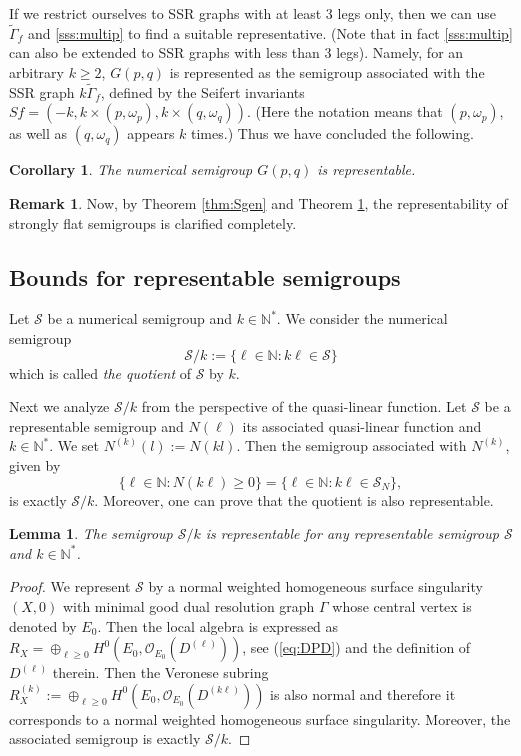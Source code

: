 \documentclass[oneside]{amsart}
\numberwithin{equation}{section}
\numberwithin{equation}{subsection}
\theoremstyle{plain}
\newtheorem{lemma}[equation]{Lemma}
\newtheorem{cor}[equation]{Corollary}
\theoremstyle{definition}
\newtheorem{remark}[equation]{Remark}
\newcommand{\calO}{{\mathcal O}}\newcommand{\calU}{{\mathcal U}}
\newcommand{\calS}{{\mathcal S}}\newcommand{\cals}{{\bf s}}\newcommand{\calst}{{\bf st}}\newcommand{\cS}{{\mathcal S}}
\newcommand{\w}{\omega}
\newcommand{\Se}{\mathcal{S}}
\begin{document}
If we restrict ourselves to SSR graphs with at least 3 legs only, then we can use $\widetilde{\Gamma}_f$ and \ref{sss:multip} to find a suitable representative. (Note that in fact \ref{sss:multip} can also be extended to SSR graphs with less than $3$ legs). Namely, for an arbitrary $k\geq 2$, $G(p,q)$ is represented as the semigroup associated with the SSR graph $k\widetilde{\Gamma}_f$, defined by the Seifert invariants $Sf=(-k,k\times (p,\w_p), k\times (q,\w_q))$. (Here the notation means that $(p,\w_p)$, as well as $(q,\w_q)$ appears $k$ times.) Thus we have concluded the following.

\begin{cor}\label{thm:twogen}
    The numerical semigroup $G(p,q)$ is representable.     
\end{cor}

\begin{remark}
Now, by Theorem \ref{thm:Sgen} and Theorem \ref{thm:twogen}, the representability of strongly flat semigroups is clarified completely. 
\end{remark}


\subsection{Bounds for representable semigroups}\label{sec:bounds}

    Let $\Se$ be a numerical semigroup and $k\in\mathbb{N}^*$. We consider the numerical semigroup 
    $$\Se/k:=\{\ell\in\mathbb{N}:k\ell\in\Se\}$$
      which is called {\it the quotient} of 
    $\Se$ by  $k$.

Next we analyze $\Se/k$  from the perspective of the quasi-linear function. Let $\calS$ be a representable semigroup  and $N(\ell)$ its associated quasi-linear function and $k\in \mathbb{N}^*$. We set $N^{(k)}(l):=N(k l)$.
Then the semigroup associated with $N^{(k)}$, given by 
\[
\{\ell\in\mathbb{N}:N(k \ell)\ge 0\}=
\{\ell\in\mathbb{N}:k \ell \in \Se_N\},
\]
 is exactly $\Se/k$. Moreover, one can prove that the quotient is also representable.
 
\begin{lemma}\label{lem:quotientrep}
The semigroup  $\Se/k$ is representable for any representable semigroup $\Se$ and $k\in \mathbb{N}^*$.
\end{lemma}

\begin{proof}
 We represent $\Se$ by a normal weighted homogeneous surface singularity $(X,0)$ with minimal good dual resolution graph $\Gamma$ whose central vertex is denoted by $E_0$. Then the local algebra is expressed as $R_X=\oplus_{\ell\geq 0} H^0(E_0, \calO_{E_0}(D^{(\ell)}))$, see (\ref{eq:DPD}) and the definition of $D^{(\ell)}$ therein. Then the Veronese subring $R_X^{(k)}:=\oplus_{\ell\geq 0} H^0(E_0, \calO_{E_0}(D^{(k\ell)}))$ is also normal and therefore it corresponds to a normal weighted homogeneous surface singularity. Moreover, the associated semigroup is exactly $\Se/k$.
\end{proof}
\end{document}
